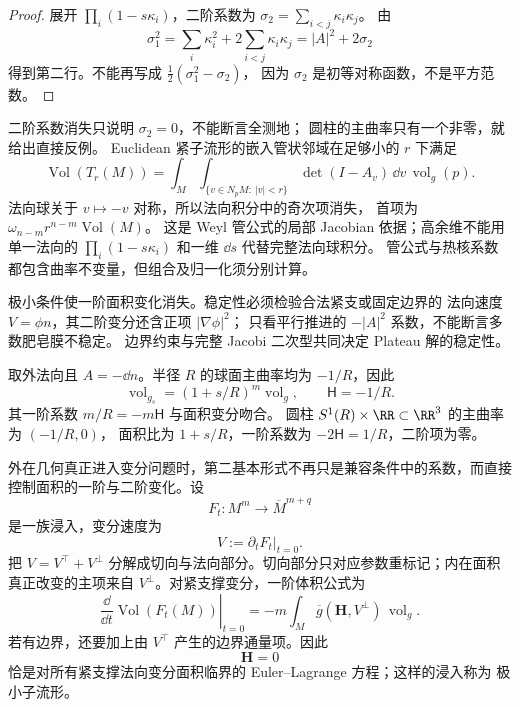 \begin{proof}
展开 $\prod_i(1-s\kappa_i)$，二阶系数为
$\sigma_2=\sum_{i<j}\kappa_i\kappa_j$。
由
\[
\sigma_1^2=\sum_i\kappa_i^2+2\sum_{i<j}\kappa_i\kappa_j
=|A|^2+2\sigma_2
\]
得到第二行。不能再写成 $\tfrac12(\sigma_1^2-\sigma_2)$，
因为 $\sigma_2$ 是初等对称函数，不是平方范数。
\end{proof}

\begin{note}
二阶系数消失只说明 $\sigma_2=0$，不能断言全测地；
圆柱的主曲率只有一个非零，就给出直接反例。
Euclidean 紧子流形的嵌入管状邻域在足够小的 $r$ 下满足
\[
\operatorname{Vol}(T_r(M))
=\int_M\int_{\{v\in N_pM:\ |v|<r\}}
\det(I-A_v)\,\dd v\,\operatorname{vol}_g(p).
\]
法向球关于 $v\mapsto-v$ 对称，所以法向积分中的奇次项消失，
首项为 $\omega_{n-m}r^{n-m}\operatorname{Vol}(M)$。
这是 Weyl 管公式的局部 Jacobian 依据；高余维不能用单一法向的
$\prod_i(1-s\kappa_i)$ 和一维 $\dd s$ 代替完整法向球积分。
管公式与热核系数都包含曲率不变量，但组合及归一化须分别计算。

极小条件使一阶面积变化消失。稳定性必须检验合法紧支或固定边界的
法向速度 $V=\phi n$，其二阶变分还含正项 $|\nabla\phi|^2$；
只看平行推进的 $-|A|^2$ 系数，不能断言多数肥皂膜不稳定。
边界约束与完整 Jacobi 二次型共同决定 Plateau 解的稳定性。
\end{note}

\begin{exbox}[球面与圆柱的外法向平行推进]
取外法向且 $A=-\dd n$。半径 $R$ 的球面主曲率均为 $-1/R$，因此
\[
\operatorname{vol}_{g_s}=(1+s/R)^m\operatorname{vol}_g,
\qquad\mathsf H=-1/R.
\]
其一阶系数 $m/R=-m\mathsf H$ 与面积变分吻合。
圆柱 $S^1(R)\times\RR\subset\RR^3$ 的主曲率为 $(-1/R,0)$，
面积比为 $1+s/R$，一阶系数为 $-2\mathsf H=1/R$，二阶项为零。
\end{exbox}

外在几何真正进入变分问题时，第二基本形式不再只是兼容条件中的系数，而直接控制面积的一阶与二阶变化。设
\[
F_t:M^m\to\overline M^{m+q}
\]
是一族浸入，变分速度为
\[
V:=\partial_tF_t|_{t=0}.
\]
把 $V=V^\top+V^\perp$ 分解成切向与法向部分。切向部分只对应参数重标记；内在面积真正改变的主项来自 $V^\perp$。对紧支撑变分，一阶体积公式为
\begin{equation}
\boxed{
\left.\frac{\dd}{\dd t}\operatorname{Vol}(F_t(M))\right|_{t=0}
=-m\int_M
\overline g(\mathbf H,V^\perp)\,\operatorname{vol}_g
}.
\label{eq:math-dg-first-variation-submanifold-volume}
\end{equation}
若有边界，还要加上由 $V^\top$ 产生的边界通量项。因此
\[
\boxed{\mathbf H=0}
\]
恰是对所有紧支撑法向变分面积临界的 Euler--Lagrange 方程；这样的浸入称为 极小子流形。

